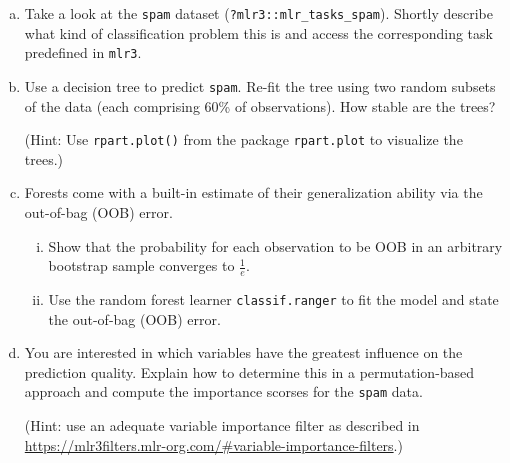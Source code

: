 \begin{enumerate}[a)]
  \item Take a look at the \texttt{spam} dataset 
  (\texttt{?mlr3::mlr\_tasks\_spam}).
  Shortly describe what kind of classification problem this is and access the 
  corresponding task predefined in \texttt{mlr3}.

  \item Use a decision tree to predict \texttt{spam}. Re-fit the tree using 
  two random subsets of the data (each comprising 60\% of observations). 
  How stable are the trees?

  (Hint: Use \texttt{rpart.plot()} from the package \texttt{rpart.plot} to 
  visualize the trees.)

  \item Forests come with a built-in estimate of their generalization 
  ability via the out-of-bag (OOB) error.
  \begin{enumerate}[i)]
    \item Show that the probability for each observation to be OOB in an 
    arbitrary bootstrap sample converges to $\tfrac{1}{e}$.
    \item Use the random forest learner \texttt{classif.ranger} to fit the 
  model and state the out-of-bag (OOB) error.
  \end{enumerate}

  \item You are interested in which variables have the greatest influence 
  on the prediction quality. 
  Explain how to determine this in a permutation-based approach and compute the
  importance scorses for the \texttt{spam} data.

  (Hint: use an adequate variable importance filter as described in \\
  \url{https://mlr3filters.mlr-org.com/#variable-importance-filters}.)
\end{enumerate}
